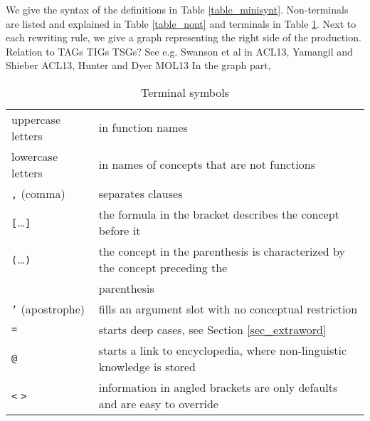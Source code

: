 \documentclass[a4paper,10pt]{article}
\begin{document}
We give the syntax of the definitions in Table \ref{table_minisynt}. Non-terminals are listed and explained in Table \ref{table_nont} and terminals  in Table \ref{table_termin}. Next to each rewriting rule, we give a graph representing the right side of the production. 
 {\color{red} Relation to TAGs TIGs TSGs? See e.g. Swanson
  et al in ACL13, Yamangil and Shieber ACL13, Hunter and Dyer MOL13}
In the graph part,

\begin{table}[h]
\begin{center}
\begin{tabular}{ll}
 uppercase letters & in function names
\\ lowercase letters & in names of concepts that are not functions
\\ \texttt{,} (comma) & separates clauses
\\ \texttt{[}\ldots \texttt{]} & the formula in the bracket describes the concept before it
\\ \texttt{(}\ldots \texttt{)} & the concept in the parenthesis is characterized by the concept preceding the \\ & parenthesis
\\ \texttt{'} (apostrophe) & fills an argument slot with no conceptual restriction
\\ \texttt{=} & starts deep cases, see Section \ref{sec_extraword}
\\ \texttt{@} & starts a link to encyclopedia, where non-linguistic knowledge is stored
\\ \texttt{<} \texttt{>}& information in angled brackets are only defaults and are easy to override
\end{tabular}
\end{center}
\caption{Terminal symbols}
\label{table_termin}
\end{table}
\end{document}
